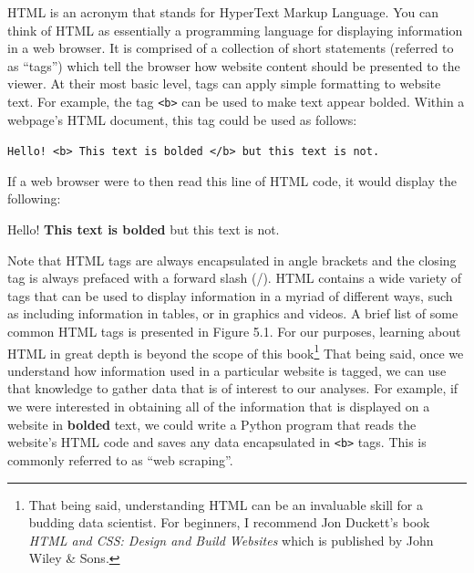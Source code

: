 \documentclass{book}
\begin{document}
	HTML is an acronym that stands for HyperText Markup Language. You can think of HTML as essentially a programming language for displaying information in a web browser. It is comprised of a collection of short statements (referred to as ``tags'') which tell the browser how website content should be presented to the viewer. At their most basic level, tags can apply simple formatting to website text. For example, the tag \texttt{<b>} can be used to make text appear bolded. Within a webpage's HTML document, this tag could be used as follows:
	
	\texttt{Hello! <b> This text is bolded </b> but this text is not.}
	
	If a web browser were to then read this line of HTML code, it would display the following:
	
	Hello! \textbf{This text is bolded} but this text is not.
	
	Note that HTML tags are always encapsulated in angle brackets and the closing tag is always prefaced with a forward slash (/). HTML contains a wide variety of tags that can be used to display information in a myriad of different ways, such as including information in tables, or in graphics and videos. A brief list of some common HTML tags is presented in Figure 5.1. For our purposes, learning about HTML in great depth is beyond the scope of this book\footnote{That being said, understanding HTML can be an invaluable skill for a budding data scientist. For beginners, I recommend Jon Duckett's book \textit{HTML and CSS: Design and Build Websites} which is published by John Wiley \& Sons.} That being said, once we understand how information used in a particular website is tagged, we can use that knowledge to gather data that is of interest to our analyses. For example, if we were interested in obtaining all of the information that is displayed on a website in \textbf{bolded} text, we could write a Python program that reads the website's HTML code and saves any data encapsulated in \texttt{<b>} tags. This is commonly referred to as ``web scraping''.
\end{document}
